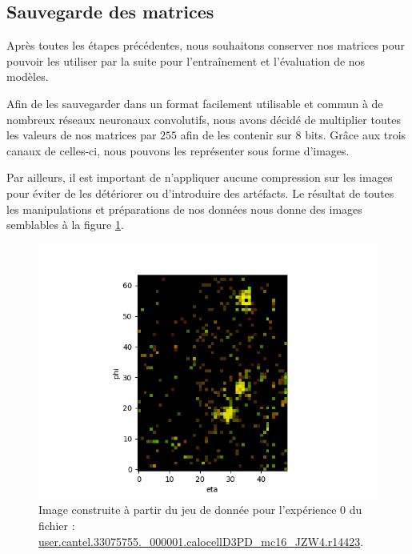 \break

\subsection{Sauvegarde des matrices}

Après toutes les étapes précédentes, nous souhaitons conserver nos matrices pour pouvoir les utiliser par la suite pour l'entraînement et l'évaluation de nos modèles.

Afin de les sauvegarder dans un format facilement utilisable et commun à de nombreux réseaux neuronaux convolutifs, nous avons décidé de multiplier toutes les valeurs de nos matrices par $255$ afin de les contenir sur $8$ bits. Grâce aux trois canaux de celles-ci, nous pouvons les représenter sous forme d'images.

Par ailleurs, il est important de n'appliquer aucune compression sur les images pour éviter de les détériorer ou d'introduire des artéfacts. Le résultat de toutes les manipulations et préparations de nos données nous donne des images semblables à la figure \ref{fig:image_type_from_dataset_49x64}.

\begin{figure}[hbt!]
    \centering
    \includegraphics[scale=0.7]{Figures/dataset/image_type_from_dataset_49x64.png}
    \caption{Image construite à partir du jeu de donnée pour l'expérience 0 du fichier : \url{user.cantel.33075755.\_000001.calocellD3PD\_mc16\_JZW4.r14423}.}
    \label{fig:image_type_from_dataset_49x64}
\end{figure}

\break

